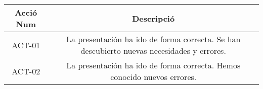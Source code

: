 
\begin{center}
\begin{tabular}{|c|c|}
\hline
{\cellcolor[gray]{.8} \bf Acció Num} & {\cellcolor[gray]{.8} \bf Descripció}  \\
\hline
ACT-01 & La presentación ha ido de forma correcta. Se han descubierto nuevas necesidades y errores. \\
\hline
ACT-02 & La presentación ha ido de forma correcta. Hemos conocido nuevos errores. \\
\hline
\end{tabular}
\end{center}
